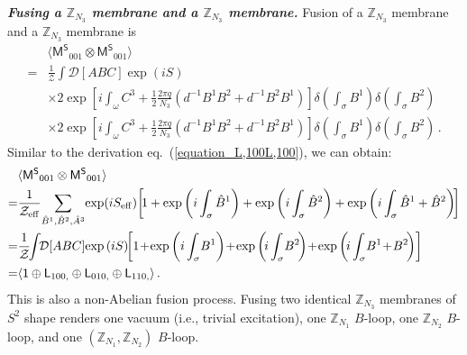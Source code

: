 \documentclass[11pt,nofootinbib,preprint]{revtex4-1}
\begin{document}
\textbf{\textit{Fusing a $\mathbb{Z} _{N_3}$ membrane and a $\mathbb{Z} _{N_3}$ membrane.}}
Fusion of a $\mathbb{Z} _{N_3}$ membrane and a $\mathbb{Z} _{N_3}$ membrane is
\begin{align}
	&\langle \mathsf{M^S}_{001}\otimes \mathsf{M^S}_{001} \rangle  \nonumber\\
	=& \frac{1}{\mathcal{Z}}\!\!\int\!\! \mathcal{D} \!\left[ ABC \right]\!   \exp \left( iS \right)\nonumber
	\\
	&\times 2\exp \left[ i\int_{\omega}{C^3+\frac{1}{2}\frac{2\pi q}{N_3}\left( d^{-1}B^1B^2+d^{-1}B^2B^1 \right)} \right] \delta \left( \int_{\sigma}{B^1} \right) \delta \left( \int_{\sigma}{B^2} \right) \nonumber
	\\
	&\times 2\exp \left[ i\!\int_{\omega}{C^3+\frac{1}{2}\frac{2\pi q}{N_3}\left( d^{-1}B^1B^2+d^{-1}B^2B^1 \right)} \right] \!\delta \left( \int_{\sigma}{B^1} \right)\! \delta \left( \int_{\sigma}{B^2} \right) \,.
\end{align}
Similar to the derivation eq.~(\ref{equation_L,100L,100}),  we can obtain:
\begin{align}
	&\langle \mathsf{M^S}_{001}\otimes \mathsf{M^S}_{001} \rangle \nonumber\\
	=& \frac{1}{\mathcal{Z}_{\rm eff}}  \!  \sum_{\hat{B}^1,\hat{B}^2,\hat{A}^3} \! \exp \! \left( iS_{\rm eff}\right) \! 
	\left[\!  1+\exp \left( i\int_{\sigma}{\hat{B}^1} \right) +\exp \left( i\int_{\sigma}{\hat{B}^2} \right) +\exp \left( i\int_{\sigma}{\hat{B}^1+\hat{B}^2} \right) \! \right] \nonumber
	\\
	\!\!=& \frac{1}{\mathcal{Z}}\!\!\int\!\! \mathcal{D} \!\left[ ABC \right]\!\exp \left( iS \right) \!\!
	\left[ 1\!+\!\exp \left( i\int_{\sigma}\!{ {B}^1} \right) \!+\!\exp \left(\! i\int_{\sigma}\!{ {B}^2} \!\right) \!+\!\exp \left(\! i\int_{\sigma}\!{ {B}^1\!+\! {B}^2} \!\right) \right] \nonumber
	\\
	=&\langle \mathsf{1}\oplus \mathsf{L}_{100,}\oplus \mathsf{L}_{010,}\oplus \mathsf{L}_{110,} \rangle	\label{equation_Ms001Ms001}\,.
\end{align}
This is also a non-Abelian fusion process. Fusing two identical $\mathbb{Z} _{N_3}$ membranes of $S^2$ shape renders   one  vacuum (i.e., trivial excitation), one $\mathbb{Z} _{N_1}$ $B$-loop, one $\mathbb{Z} _{N_2}$ $B$-loop, and one $ \left( \mathbb{Z} _{N_1},\mathbb{Z} _{N_2} \right) $ $B$-loop. 
\end{document}
